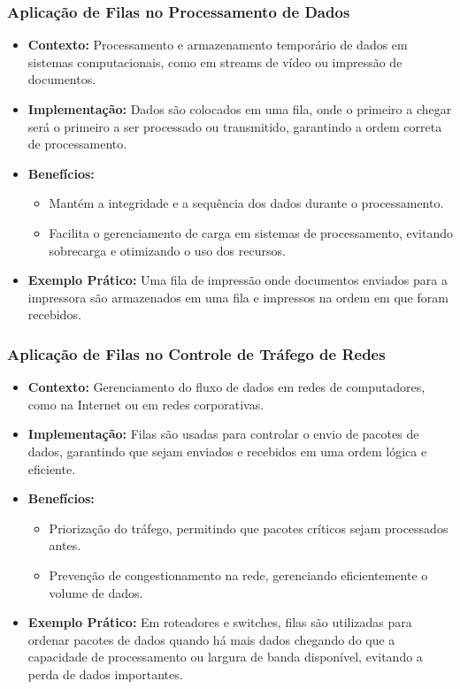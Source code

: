 \begin{frame}[fragile]
  \frametitle{Aplicação de Filas no Processamento de Dados}
  \begin{itemize}
    \item \textbf{Contexto:} Processamento e armazenamento temporário de dados em sistemas computacionais, como em streams de vídeo ou impressão de documentos.
    \item \textbf{Implementação:} Dados são colocados em uma fila, onde o primeiro a chegar será o primeiro a ser processado ou transmitido, garantindo a ordem correta de processamento.
    \item \textbf{Benefícios:}
      \begin{itemize}
        \item Mantém a integridade e a sequência dos dados durante o processamento.
        \item Facilita o gerenciamento de carga em sistemas de processamento, evitando sobrecarga e otimizando o uso dos recursos.
      \end{itemize}
    \item \textbf{Exemplo Prático:} Uma fila de impressão onde documentos enviados para a impressora são armazenados em uma fila e impressos na ordem em que foram recebidos.
  \end{itemize}
\end{frame}

\begin{frame}[fragile]
  \frametitle{Aplicação de Filas no Controle de Tráfego de Redes}
  \begin{itemize}
    \item \textbf{Contexto:} Gerenciamento do fluxo de dados em redes de computadores, como na Internet ou em redes corporativas.
    \item \textbf{Implementação:} Filas são usadas para controlar o envio de pacotes de dados, garantindo que sejam enviados e recebidos em uma ordem lógica e eficiente.
    \item \textbf{Benefícios:}
      \begin{itemize}
        \item Priorização do tráfego, permitindo que pacotes críticos sejam processados antes.
        \item Prevenção de congestionamento na rede, gerenciando eficientemente o volume de dados.
      \end{itemize}
    \item \textbf{Exemplo Prático:} Em roteadores e switches, filas são utilizadas para ordenar pacotes de dados quando há mais dados chegando do que a capacidade de processamento ou largura de banda disponível, evitando a perda de dados importantes.
  \end{itemize}
\end{frame}

